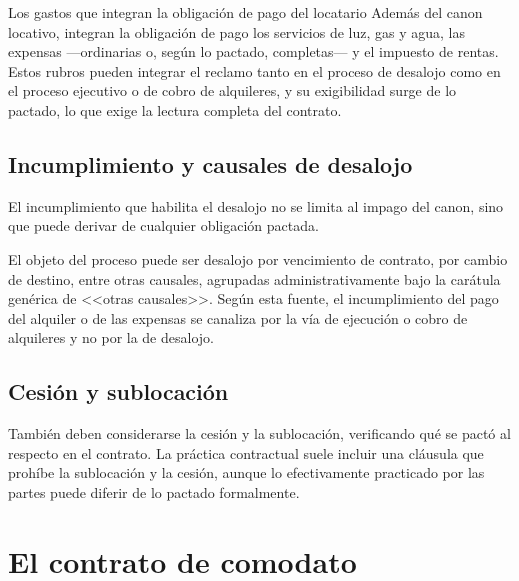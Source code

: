 \documentclass[12pt,oneside]{book}
\begin{document}
\begin{example}{Los gastos que integran la obligación de pago del locatario}
Además del canon locativo, integran la obligación de pago los servicios de luz, gas y agua, las expensas ---ordinarias o, según lo pactado, completas--- y el impuesto de rentas. Estos rubros pueden integrar el reclamo tanto en el proceso de desalojo como en el proceso ejecutivo o de cobro de alquileres, y su exigibilidad surge de lo pactado, lo que exige la lectura completa del contrato.
\end{example}

\subsection{Incumplimiento y causales de desalojo}

El incumplimiento que habilita el desalojo no se limita al impago del canon, sino que puede derivar de cualquier obligación pactada.

\begin{note}
El objeto del proceso puede ser desalojo por vencimiento de contrato, por cambio de destino, entre otras causales, agrupadas administrativamente bajo la carátula genérica de <<otras causales>>. Según esta fuente, el incumplimiento del pago del alquiler o de las expensas se canaliza por la vía de ejecución o cobro de alquileres y no por la de desalojo.
\end{note}

\subsection{Cesión y sublocación}

También deben considerarse la cesión y la sublocación, verificando qué se pactó al respecto en el contrato. La práctica contractual suele incluir una cláusula que prohíbe la sublocación y la cesión, aunque lo efectivamente practicado por las partes puede diferir de lo pactado formalmente.

\section{El contrato de comodato}
\end{document}
